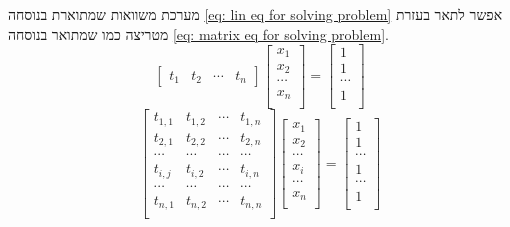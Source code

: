 \documentclass[12pt,leqno]{article}
\theoremstyle{theoremdd}
\begin{document}
מערכת משוואות 
שמתוארת בנוסחה
\ref{eq: lin eq for solving problem}
אפשר לתאר
בעזרת מטריצה כמו שמתואר 
בנוסחה 
\ref{eq: matrix eq for solving problem}.
\begin{equation*}
    \begin{bmatrix}
        t_1 & t_2 & \cdots & t_n
    \end{bmatrix}
    \begin{bmatrix}
        x_1 \\
        x_2 \\
        \cdots \\
        x_n \\
    \end{bmatrix}
    =
    \begin{bmatrix}
        1 \\
        1 \\
        \cdots \\
        1 \\
    \end{bmatrix}
\end{equation*}
\begin{equation}
    \label{eq: matrix eq for solving problem}
    \begin{bmatrix}
        t_{1,1} & t_{1,2} & \cdots & t_{1,n} \\
        t_{2,1} & t_{2,2} & \cdots & t_{2,n} \\
        \cdots & \cdots & \cdots & \cdots\\
        t_{i,j} & t_{i,2} & \cdots & t_{i,n} \\
        \cdots & \cdots & \cdots & \cdots\\
        t_{n,1} & t_{n,2} & \cdots & t_{n,n} \\
    \end{bmatrix}
    \begin{bmatrix}
        x_1 \\
        x_2 \\
        \cdots \\
        x_i \\
        \cdots \\
        x_n \\
    \end{bmatrix}
    = 
    \begin{bmatrix}
        1 \\
        1 \\
        \cdots \\
        1 \\
        \cdots \\
        1 \\
    \end{bmatrix}
\end{equation}
\end{document}
